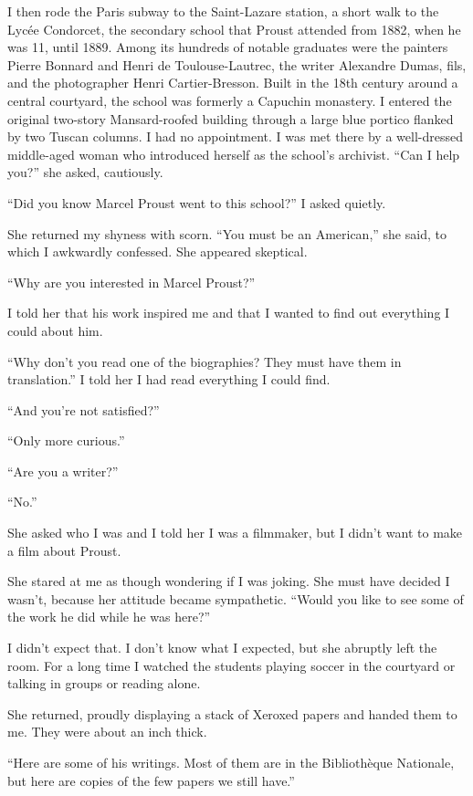 I then rode the Paris subway to the Saint-Lazare station, a short walk
to the Lycée Condorcet, the secondary school that Proust attended from
1882, when he was 11, until 1889. Among its hundreds of notable
graduates were the painters Pierre Bonnard and Henri de
Toulouse-Lautrec, the writer Alexandre Dumas, fils, and the photographer
Henri Cartier-Bresson. Built in the 18th century around a central
courtyard, the school was formerly a Capuchin monastery. I entered the
original two-story Mansard-roofed building through a large blue portico
flanked by two Tuscan columns. I had no appointment. I was met there by
a well-dressed middle-aged woman who introduced herself as the school's
archivist. ``Can I help you?'' she asked, cautiously.

``Did you know Marcel Proust went to this school?'' I asked quietly.

She returned my shyness with scorn. ``You must be an American,'' she
said, to which I awkwardly confessed. She appeared skeptical.

``Why are you interested in Marcel Proust?''

I told her that his work inspired me and that I wanted to find out
everything I could about him.

``Why don't you read one of the biographies? They must have them in
translation.'' I told her I had read everything I could find.

``And you're not satisfied?''

``Only more curious.''

``Are you a writer?''

``No.''

She asked who I was and I told her I was a filmmaker, but I didn't want
to make a film about Proust.

She stared at me as though wondering if I was joking. She must have
decided I wasn't, because her attitude became sympathetic. ``Would you
like to see some of the work he did while he was here?''

I didn't expect that. I don't know what I expected, but she abruptly
left the room. For a long time I watched the students playing soccer in
the courtyard or talking in groups or reading alone.

She returned, proudly displaying a stack of Xeroxed papers and handed
them to me. They were about an inch thick.

``Here are some of his writings. Most of them are in the Bibliothèque
Nationale, but here are copies of the few papers we still have.''

